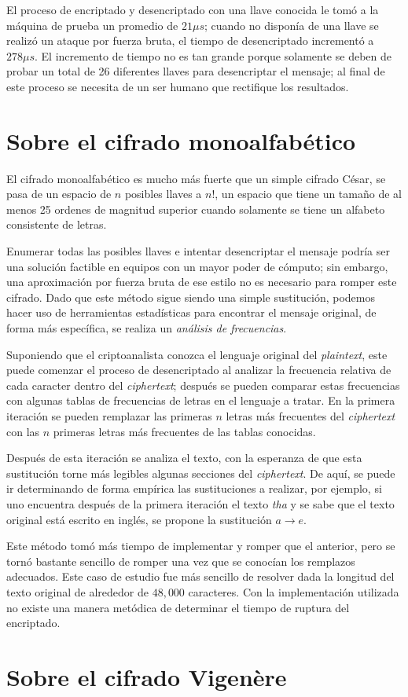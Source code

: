 \documentclass{article}
\begin{document}
        El proceso de encriptado y desencriptado con una llave conocida le tomó a la máquina de prueba un promedio de $21 \mu s$; cuando no disponía de una llave se realizó un ataque por fuerza bruta, el tiempo de desencriptado incrementó a $278 \mu s$. El incremento de tiempo no es tan grande porque solamente se deben de probar un total de 26 diferentes llaves para desencriptar el mensaje; al final de este proceso se necesita de un ser humano que rectifique los resultados.

    \section{Sobre el cifrado monoalfabético}
        El cifrado monoalfabético es mucho más fuerte que un simple cifrado César, se pasa de un espacio de $n$ posibles llaves a $n!$, un espacio que tiene un tamaño de al menos 25 ordenes de magnitud superior cuando solamente se tiene un alfabeto consistente de letras. 
        
        Enumerar todas las posibles llaves e intentar desencriptar el mensaje podría ser una solución factible en equipos con un mayor poder de cómputo; sin embargo, una aproximación por fuerza bruta de ese estilo no es necesario para romper este cifrado. Dado que este método sigue siendo una simple sustitución, podemos hacer uso de herramientas estadísticas para encontrar el mensaje original, de forma más específica, se realiza un \emph{análisis de frecuencias}.

        Suponiendo que el criptoanalista conozca el lenguaje original del \emph{plaintext}, este puede comenzar el proceso de desencriptado al analizar la frecuencia relativa de cada caracter dentro del \emph{ciphertext}; después se pueden comparar estas frecuencias con algunas tablas de frecuencias de letras en el lenguaje a tratar. En la primera iteración se pueden remplazar las primeras $n$ letras más frecuentes del \emph{ciphertext} con las $n$ primeras letras más frecuentes de las tablas conocidas.

        Después de esta iteración se analiza el texto, con la esperanza de que esta sustitución torne más legibles algunas secciones del \emph{ciphertext}. De aquí, se puede ir determinando de forma empírica las sustituciones a realizar, por ejemplo, si uno encuentra después de la primera iteración el texto \emph{tha} y se sabe que el texto original está escrito en inglés, se propone la sustitución $a \rightarrow e$.

        Este método tomó más tiempo de implementar y romper que el anterior, pero se tornó bastante sencillo de romper una vez que se conocían los remplazos adecuados. Este caso de estudio fue más sencillo de resolver dada la longitud del texto original de alrededor de $48,000$ caracteres. Con la implementación utilizada no existe una manera metódica de determinar el tiempo de ruptura del encriptado.

    \section{Sobre el cifrado Vigenère}
\end{document}
